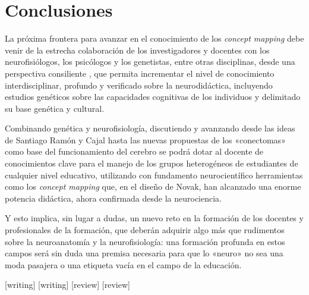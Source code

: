 \documentclass[spanish]{textolivre}
\begin{document}
\section{Conclusiones}\label{sec-conclusiones}

La próxima frontera para avanzar en el conocimiento de los \textit{concept mapping} debe venir de la estrecha colaboración de los investigadores y docentes con los neurofisiólogos, los psicólogos y los genetistas, entre otras disciplinas, desde una perspectiva consiliente \cite{wilson1999unity}, %
que permita incrementar el nivel de conocimiento interdisciplinar, profundo y verificado \cite{dennett_conciencia_1995} %
sobre la neurodidáctica, incluyendo estudios genéticos sobre las capacidades cognitivas de los individuos y delimitado su base genética y cultural.

Combinando genética y neurofisiología, discutiendo y avanzando desde las ideas de Santiago Ramón y Cajal hasta las nuevas propuestas de los «conectomas» como base del funcionamiento del cerebro \cite{swanson2016cajal} %
se podrá dotar al docente de conocimientos clave para el manejo de los grupos heterogéneos de estudiantes de cualquier nivel educativo, utilizando con fundamento neurocientífico herramientas como los \textit{concept mapping} que, en el diseño de Novak, han alcanzado una enorme potencia didáctica, ahora confirmada desde la neurociencia.

Y esto implica, sin lugar a dudas, un nuevo reto en la formación de los docentes y profesionales de la formación, que deberán adquirir algo más que rudimentos sobre la neuroanatomía y la neurofisiología: una formación profunda en estos campos será sin duda una premisa necesaria para que lo «neuro» no sea una moda pasajera o una etiqueta vacía en el campo de la educación.




\printbibliography\label{sec-bib}


\begin{contributors}
[writing]
[writing]
[review]
[review]
\end{contributors}





\end{document}
